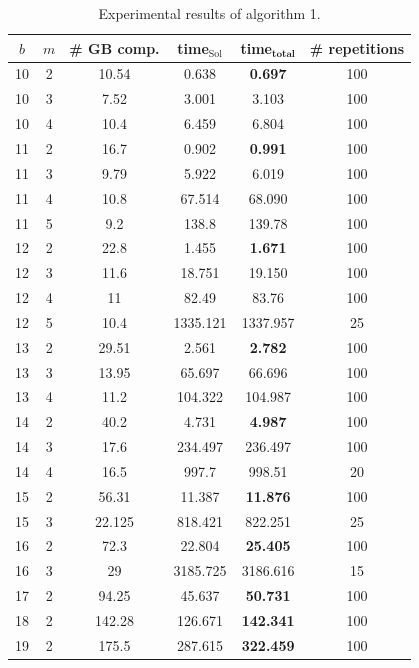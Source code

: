 \documentclass[thesis=M,english]{FITthesis}[2012/10/20]
\theoremstyle{remark}
\theoremstyle{definition}
\begin{document}
\begin{table}[H]
\centering
\begin{tabular}{ |c||c|c|c|c|c| } 
\hline
$b$ & $m$ & \# GB comp. & time$_\text{Sol}$ & \textbf{time}$_\textbf{total}$ & \# repetitions \\
 \hline
 \hline
10 & 2 & 10.54 & 0.638 & \textbf{0.697} & 100 \\ \hline
10 & 3 & 7.52 & 3.001 & 3.103 & 100 \\ \hline
10 & 4 & 10.4 & 6.459 & 6.804 & 100 \\ \hline \hline
11 & 2 & 16.7 & 0.902 & \textbf{0.991} & 100  \\ \hline
11 & 3 & 9.79 & 5.922 & 6.019 & 100  \\ \hline
11 & 4 & 10.8 & 67.514 & 68.090 & 100 \\ \hline
11 & 5	& 9.2 & 138.8 & 139.78 & 100 \\ \hline \hline
12 & 2 & 22.8 & 1.455 & \textbf{1.671} & 100 \\ \hline
12 & 3 & 11.6 & 18.751 & 19.150 & 100 \\ \hline
12 & 4 & 11 & 82.49 & 83.76 & 100 \\ \hline
12 & 5  & 10.4 & 1335.121 & 1337.957 &  25 \\ \hline \hline
13 & 2 & 29.51 & 2.561 & \textbf{2.782} & 100 \\ \hline
13 & 3 & 13.95 & 65.697 & 66.696 & 100 \\ \hline
13 & 4 & 11.2 & 104.322 & 104.987 & 100	\\ \hline \hline
14 & 2 & 40.2 & 4.731 & \textbf{4.987} & 100 \\ \hline
14 & 3 & 17.6 & 234.497 & 236.497 & 100 \\ \hline
14 & 4 & 16.5 & 997.7 & 998.51 & 20 \\ \hline \hline
15 & 2 & 56.31 & 11.387 & \textbf{11.876} & 100 \\ \hline
15 & 3 & 22.125 & 818.421 & 822.251 & 25 \\ \hline \hline
16 & 2 & 72.3 & 22.804 & \textbf{25.405} & 100 \\ \hline
16 & 3 & 29 & 3185.725 & 3186.616 & 15 \\ \hline \hline
17 & 2 & 94.25 & 45.637 & \textbf{50.731} & 100 \\ \hline \hline
18 & 2 & 142.28 & 126.671 & \textbf{142.341} & 100 \\ \hline \hline
19 & 2 & 175.5 & 287.615 & \textbf{322.459} & 100 \\ 
\hline
\end{tabular}
\caption[Experimental results of algorithm 1]{Experimental results of algorithm 1.}
\label{sem}
\end{table}
\end{document}
